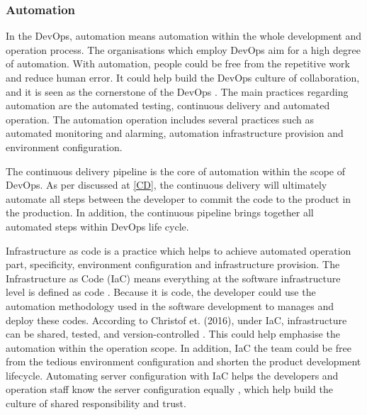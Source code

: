 \subsubsection[]{Automation}
In the DevOps, automation means 
automation within the whole development and operation process. The organisations which employ DevOps aim for a high degree of automation\cite{erich2017qualitative}.
With automation, people could be free from the repetitive work and reduce human error. It could help build the DevOps culture of collaboration, and it is seen as the cornerstone of the DevOps \cite{DevOpsCu76:online}.
The main practices regarding automation are the automated testing, continuous delivery and automated operation. The automation operation includes several practices such as automated monitoring and alarming, automation infrastructure provision and environment configuration.
\par
The continuous delivery pipeline is the core of automation within the scope of DevOps. As per discussed at \ref{CD}, the continuous delivery will ultimately automate all steps between the developer to commit the code to the product in the production. In addition, the continuous pipeline brings together all automated steps within DevOps life cycle.
\par
\label{iasc}
Infrastructure as code is a practice which helps to achieve automated operation part, specificity, environment configuration and infrastructure provision. The Infrastructure as Code (IaC) means everything at the software infrastructure level is defined as code \cite{artac2017devops}. Because it is code, the developer could use the automation methodology used in the software development to manages and deploy these codes. According to Christof et. (2016), under IaC, infrastructure can be shared, tested, and version-controlled \cite{ebert2016devops}. This could help emphasise the automation within the operation scope. In addition, IaC the team could be free from the tedious environment configuration and shorten the product development lifecycle. Automating server configuration with IaC helps the developers and operation staff know the server configuration equally \cite{DevOpsCu76:online}, which help build the culture of shared responsibility and trust.
